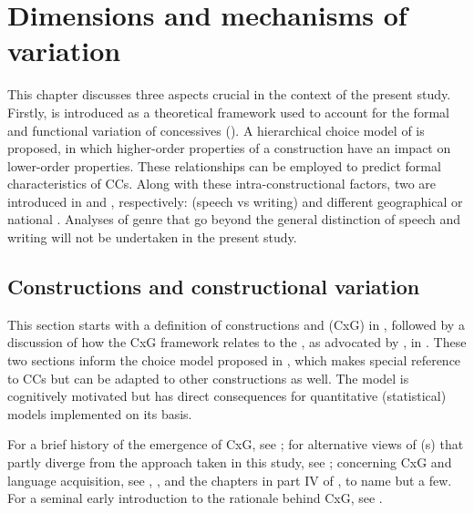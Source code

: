 \chapter{\label{bkm:Ref3457828}Dimensions and mechanisms of variation}\label{sec:4}

This chapter discusses three aspects crucial in the context of the present study. Firstly,  is introduced as a theoretical framework used to account for the formal and functional variation of concessives (). A hierarchical choice model of  is proposed, in which higher-order properties of a construction have an impact on lower-order properties. These relationships can be employed to predict formal characteristics of CCs. Along with these intra-constructional factors, two  are introduced in  and , respectively:  (speech vs writing) and different geographical or national . Analyses of genre that go beyond the general distinction of speech and writing will not be undertaken in the present study.

\section{\label{bkm:Ref488418230}\label{bkm:Ref465410054}\label{bkm:Ref465410417}Constructions and constructional variation}\label{sec:4.1}

This section starts with a definition of constructions and  (CxG) in , followed by a discussion of how the CxG framework relates to the , as advocated by \citet{Bybee2001, Bybee2006, Bybee2010}, in . These two sections inform the choice model proposed in , which makes special reference to CCs but can be adapted to other constructions as well. The model is cognitively motivated but has direct consequences for quantitative (statistical) models implemented on its basis.

  For a brief history of the emergence of CxG, see \citet{ÖstmanFried2005}; for alternative views of (s) that partly diverge from the approach taken in this study, see \citet[165–289]{CroftCruse2004}; concerning CxG and language acquisition, see \citet[222]{Goldberg2003}, \citet{Tomasello2005, Tomasello2006}, and the chapters in part IV of \citet{HoffmannTrousdale2013}, to name but a few. For a seminal early introduction to the rationale behind CxG, see \citet{Fillmore1988}.

